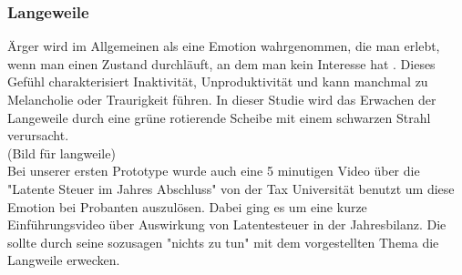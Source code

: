 \subsubsection{Langeweile} \label{langeweile-1}


Ärger wird im Allgemeinen als eine Emotion wahrgenommen, die man erlebt, wenn man einen Zustand durchläuft, an dem man kein Interesse hat \cite{vodanovich_2003}. Dieses Gefühl charakterisiert Inaktivität, Unproduktivität und kann manchmal zu Melancholie oder Traurigkeit führen.
In dieser Studie wird das Erwachen der Langeweile durch eine grüne rotierende Scheibe mit einem schwarzen Strahl verursacht. \\

(Bild für langweile)\\

Bei unserer ersten Prototype wurde auch eine 5 minutigen Video über die "Latente Steuer im Jahres Abschluss" von der Tax Universität benutzt um diese Emotion bei Probanten auszulösen. Dabei ging es um eine kurze Einführungsvideo über Auswirkung von Latentesteuer in der Jahresbilanz. Die sollte durch seine sozusagen "nichts zu tun" mit dem vorgestellten Thema die Langweile erwecken.